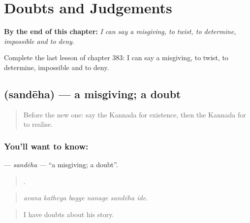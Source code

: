 
\chapter{Doubts and Judgements}
\label{ch:ka-doubts-and-judgements}

\begin{chapteropening}
\textbf{By the end of this chapter:} \emph{I can say a misgiving, to twist, to determine, impossible and to deny.}

Complete the last lesson of chapter 383: I can say a misgiving, to twist, to determine, impossible and to deny.
\end{chapteropening}

\section[\texorpdfstring{\kn{ಸಂದೇಹ} (sandēha)}{ಸಂದೇಹ (sandēha)}]{ (sandēha) — a misgiving; a doubt}

\label{lesson:KA-C383-sandeha}



\begin{quote}
Before the new one: say the Kannada for existence, then the Kannada for to realise.
\end{quote}

\subsection*{You'll want to know: }
\textbf{} — \emph{sandēha} — \textquotedblleft{}a misgiving; a doubt\textquotedblright{}.

\begin{quote}
     .
\end{quote}

\begin{quote}
\emph{avana katheya bagge nanage sandēha ide.}
\end{quote}

\begin{quote}
I have doubts about his story.
\end{quote}

